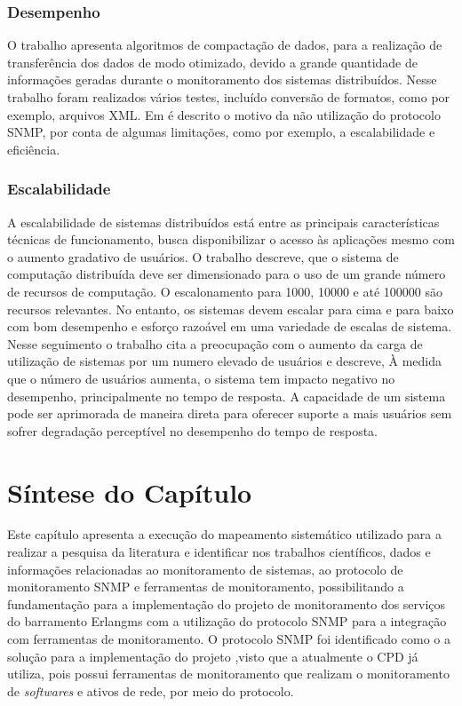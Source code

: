 \subsubsection{Desempenho}

O trabalho \cite{wang2016improvements} apresenta algoritmos de compactação de dados, para a realização de transferência dos dados de modo otimizado, devido a grande quantidade de informações geradas durante o monitoramento dos sistemas distribuídos. Nesse trabalho foram realizados vários testes, incluído conversão de formatos, como por exemplo, arquivos XML. Em \cite{kotsopoulos2008soa} é descrito o motivo da não utilização do protocolo SNMP, por conta de algumas limitações, como por exemplo, a escalabilidade e eficiência. 

\subsubsection{Escalabilidade}

A escalabilidade de sistemas distribuídos está entre as principais características técnicas de funcionamento, busca disponibilizar o acesso às aplicações mesmo com o aumento gradativo de usuários. O trabalho \cite{1015543} descreve, que o sistema de computação distribuída deve ser dimensionado para o uso de um grande número de recursos de computação. O escalonamento para 1000, 10000 e até 100000 são recursos relevantes. No entanto, os sistemas devem escalar para cima e para baixo com bom desempenho e esforço razoável em uma variedade de escalas de sistema. Nesse seguimento o trabalho \cite{4359423} cita a preocupação com o aumento da carga de utilização de sistemas por um numero elevado de usuários e descreve, À medida que o número de usuários aumenta, o sistema tem impacto negativo no desempenho, principalmente no tempo de resposta. A capacidade de um sistema pode ser aprimorada de maneira direta para oferecer suporte a mais usuários sem sofrer degradação perceptível no desempenho do tempo de resposta. 

\section{Síntese do Capítulo}

Este capítulo apresenta a execução do mapeamento sistemático utilizado para a realizar a pesquisa da literatura e identificar nos trabalhos científicos, dados e informações relacionadas ao monitoramento de sistemas, ao protocolo de monitoramento \acrshort{SNMP} e ferramentas de monitoramento, possibilitando a fundamentação para a implementação do projeto de monitoramento dos serviços do barramento Erlangms com a utilização do protocolo \acrshort{SNMP} para a integração com ferramentas de monitoramento. O protocolo \acrshort{SNMP} foi identificado como o a solução para a implementação do projeto ,visto que a atualmente o \acrshort{CPD} já utiliza, pois  possui ferramentas de monitoramento que realizam o monitoramento de \textit{softwares} e ativos de rede, por meio do protocolo. 

